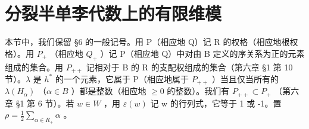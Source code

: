 \section{分裂半单李代数上的有限维模}

本节中，我们保留 §6 的一般记号。用 P（相应地 Q）记 R 的权格（相应地根权格）。用 \(P_{+}\) （相应地 \(Q_{+}\) ）记 P（相应地 Q）中对由 B 定义的序关系为正的元素组成的集合。用 \(P_{++}\) 记相对于 B 的 R 的支配权组成的集合（第六章 §1 第 10 节）。\(\lambda\) 是 \(h^{*}\) 的一个元素，它属于 P（相应地属于 \(P_{++}\) ）当且仅当所有的 \(\lambda(H_{\alpha})\) （\(\alpha \in B\) ）都是整数（相应地 \(\geq 0\) 的整数）。我们有 \(P_{++} \subset P_{+}\) （第六章 §1 第 6 节）。若 \(w \in W\) ，用 \(\varepsilon(w)\) 记 w 的行列式，它等于 1 或 -1。置 \(\rho = \frac{1}{2} \sum_{\alpha \in R_{+}} \alpha\) 。
\relax{}
